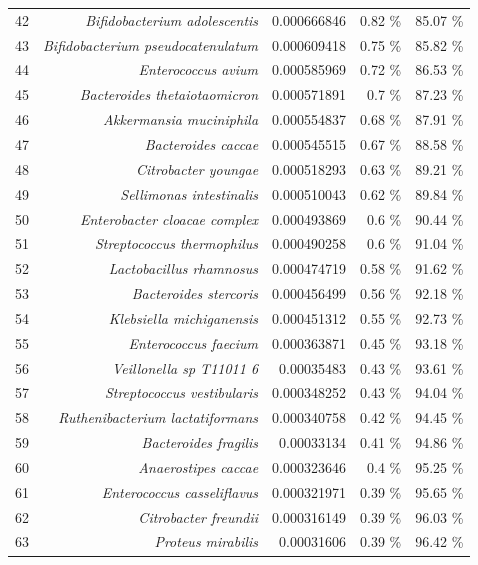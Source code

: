 \documentclass{article}
\begin{document}
\begin{table}
\begin{tabular}{|r|r|r|r|r|}
      42 & \textit{Bifidobacterium adolescentis} & 0.000666846 & 0.82 \% & 85.07 \% \\
      43 & \textit{Bifidobacterium pseudocatenulatum} & 0.000609418 & 0.75 \% & 85.82 \% \\
      44 & \textit{Enterococcus avium} & 0.000585969 & 0.72 \% & 86.53 \% \\
      45 & \textit{Bacteroides thetaiotaomicron} & 0.000571891 & 0.7 \% & 87.23 \% \\
      46 & \textit{Akkermansia muciniphila} & 0.000554837 & 0.68 \% & 87.91 \% \\
      47 & \textit{Bacteroides caccae} & 0.000545515 & 0.67 \% & 88.58 \% \\
      48 & \textit{Citrobacter youngae} & 0.000518293 & 0.63 \% & 89.21 \% \\
      49 & \textit{Sellimonas intestinalis} & 0.000510043 & 0.62 \% & 89.84 \% \\
      50 & \textit{Enterobacter cloacae complex} & 0.000493869 & 0.6 \% & 90.44 \% \\
      51 & \textit{Streptococcus thermophilus} & 0.000490258 & 0.6 \% & 91.04 \% \\
      52 & \textit{Lactobacillus rhamnosus} & 0.000474719 & 0.58 \% & 91.62 \% \\
      53 & \textit{Bacteroides stercoris} & 0.000456499 & 0.56 \% & 92.18 \% \\
      54 & \textit{Klebsiella michiganensis} & 0.000451312 & 0.55 \% & 92.73 \% \\
      55 & \textit{Enterococcus faecium} & 0.000363871 & 0.45 \% & 93.18 \% \\
      56 & \textit{Veillonella sp T11011 6} & 0.00035483 & 0.43 \% & 93.61 \% \\
      57 & \textit{Streptococcus vestibularis} & 0.000348252 & 0.43 \% & 94.04 \% \\
      58 & \textit{Ruthenibacterium lactatiformans} & 0.000340758 & 0.42 \% & 94.45 \% \\
      59 & \textit{Bacteroides fragilis} & 0.00033134 & 0.41 \% & 94.86 \% \\
      60 & \textit{Anaerostipes caccae} & 0.000323646 & 0.4 \% & 95.25 \% \\
      61 & \textit{Enterococcus casseliflavus} & 0.000321971 & 0.39 \% & 95.65 \% \\
      62 & \textit{Citrobacter freundii} & 0.000316149 & 0.39 \% & 96.03 \% \\
      63 & \textit{Proteus mirabilis} & 0.00031606 & 0.39 \% & 96.42 \% \\

\end{tabular}
\end{table}
\end{document}
